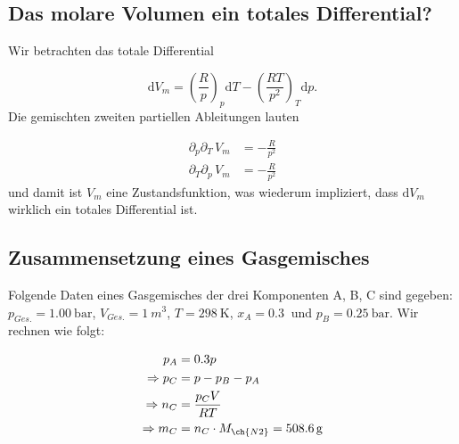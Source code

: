   \subsection{Das molare Volumen ein totales Differential?}
  
    Wir betrachten das totale Differential
    
      \begin{equation}
        \text{d} V_m = \left(\frac{R}{p}\right)_p \text{d} T - \left(\frac{RT}{p^2}\right)_T \text{d}p.
      \end{equation}
    Die gemischten zweiten partiellen Ableitungen lauten
    
      \begin{equation}
        \begin{split}
          \partial_{p}\partial_{T} \, V_m &= -\frac{R}{p^2} \\
          \partial_{T}\partial_{p} \, V_m &= -\frac{R}{p^2}
        \end{split}
      \end{equation}
    und damit ist $V_m$ eine Zustandsfunktion, was wiederum impliziert, dass $\text{d} V_m$ wirklich ein totales Differential ist.
    
  \subsection{Zusammensetzung eines Gasgemisches}
  
    Folgende Daten eines Gasgemisches der drei Komponenten A, B, C sind gegeben: $p_{Ges.} = \SI[mode=text]{1.00}{\bar}$, $V_{Ges.} = \SI[mode=text]{1}{m^3}$, $T = \SI[mode=text]{298}{\kelvin}$, $x_A = \SI[mode=text]{0.3}{}$ und $p_B = \SI[mode=text]{0.25}{\bar}$. Wir rechnen wie folgt:
    
    \begin{equation}
      \begin{split}
        p_A &= 0.3 p \\
        \Rightarrow p_C &= p - p_B - p_A \\
        \Rightarrow n_C &= \frac{p_C V}{RT} \\
        \Rightarrow m_C &= n_C \cdot M_{\ch{N2}} = \SI[mode=text]{508.6}{\gram}
      \end{split}
    \end{equation}
    